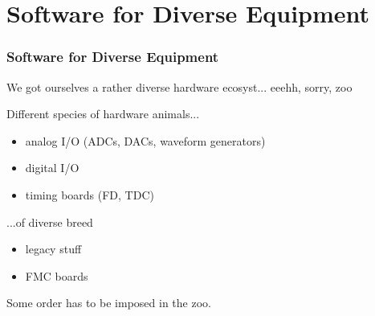 \documentclass[compress,red]{beamer}
\begin{document}

\section{Software for Diverse Equipment}

\begin{frame}
\frametitle{Software for Diverse Equipment}

We got ourselves a rather diverse hardware ecosyst...
\pause eeehh, sorry, \pause zoo
\pause
\begin{block}{Different species of hardware animals...}
\begin{itemize}
\pause\item analog I/O (ADCs, DACs, waveform generators)
\pause\item digital I/O
\pause\item timing boards (FD, TDC)
\end{itemize}
\end{block}
\pause
\begin{block}{...of diverse breed}
\begin{itemize}
\pause\item legacy stuff
\pause\item FMC boards
\end{itemize}
\end{block}

\pause Some order has to be imposed in the zoo.
\end{frame}
\end{document}
